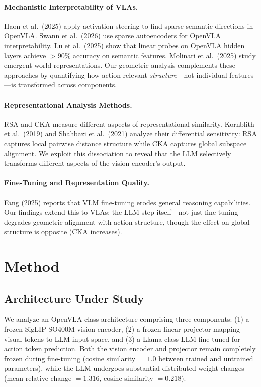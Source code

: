 \documentclass[letterpaper]{article}
\begin{document}
\paragraph{Mechanistic Interpretability of VLAs.}
Haon et al.\ (2025) apply activation steering to find sparse semantic directions in OpenVLA.
Swann et al.\ (2026) use sparse autoencoders for OpenVLA interpretability.
Lu et al.\ (2025) show that linear probes on OpenVLA hidden layers achieve $>90\%$ accuracy on semantic features.
Molinari et al.\ (2025) study emergent world representations.
Our geometric analysis complements these approaches by quantifying how action-relevant \emph{structure}---not individual features---is transformed across components.

\paragraph{Representational Analysis Methods.}
RSA \citep{kriegeskorte2008rsa} and CKA \citep{kornblith2019cka} measure different aspects of representational similarity.
Kornblith et al.\ (2019) and Shahbazi et al.\ (2021) analyze their differential sensitivity: RSA captures local pairwise distance structure while CKA captures global subspace alignment.
We exploit this dissociation to reveal that the LLM selectively transforms different aspects of the vision encoder's output.

\paragraph{Fine-Tuning and Representation Quality.}
Fang (2025) reports that VLM fine-tuning erodes general reasoning capabilities.
Our findings extend this to VLAs: the LLM step itself---not just fine-tuning---degrades geometric alignment with action structure, though the effect on global structure is opposite (CKA increases).

\section{Method}

\subsection{Architecture Under Study}

We analyze an OpenVLA-class architecture comprising three components: (1) a frozen SigLIP-SO400M vision encoder, (2) a frozen linear projector mapping visual tokens to LLM input space, and (3) a Llama-class LLM fine-tuned for action token prediction.
Both the vision encoder and projector remain completely frozen during fine-tuning (cosine similarity $= 1.0$ between trained and untrained parameters), while the LLM undergoes substantial distributed weight changes (mean relative change $= 1.316$, cosine similarity $= 0.218$).
\end{document}
